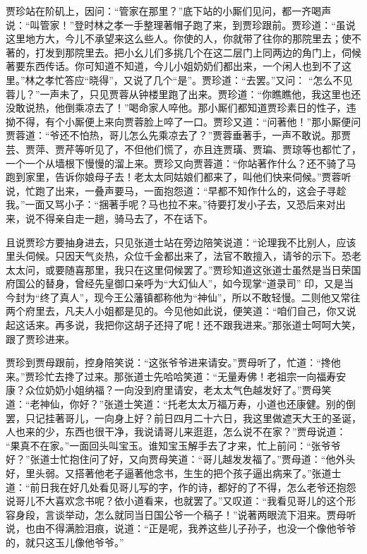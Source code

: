 \begin{parag}


    贾珍站在阶矶上，因问：“管家在那里？”底下站的小厮们见问，都一齐喝声说：“叫管家！”登时林之孝一手整理著帽子跑了来，到贾珍跟前。贾珍道：“虽说这里地方大，今儿不承望来这么些人。你使的人，你就带了往你的那院里去；使不著的，打发到那院里去。把小幺儿们多挑几个在这二层门上同两边的角门上，伺候著要东西传话。你可知道不知道，今儿小姐奶奶们都出来，一个闲人也到不了这里。”林之孝忙答应“晓得”，又说了几个“是”。贾珍道：“去罢。”又问： “怎么不见蓉儿？”一声未了，只见贾蓉从钟楼里跑了出来。贾珍道：“你瞧瞧他，我这里也还没敢说热，他倒乘凉去了！”喝命家人啐他。那小厮们都知道贾珍素日的性子，违拗不得，有个小厮便上来向贾蓉脸上啐了一口。贾珍又道：“问著他！”那小厮便问贾蓉道：“爷还不怕热，哥儿怎么先乘凉去了？”贾蓉垂著手，一声不敢说。那贾芸、贾萍、贾芹等听见了，不但他们慌了，亦且连贾璜、贾㻞、贾琼等也都忙了，一个一个从墙根下慢慢的溜上来。贾珍又向贾蓉道：“你站著作什么？还不骑了马跑到家里，告诉你娘母子去！老太太同姑娘们都来了，叫他们快来伺候。”贾蓉听说，忙跑了出来，一叠声要马，一面抱怨道：“早都不知作什么的，这会子寻趁我。”一面又骂小子：“捆著手呢？马也拉不来。”待要打发小子去，又恐后来对出来，说不得亲自走一趟，骑马去了，不在话下。
\end{parag}


\begin{parag}


    且说贾珍方要抽身进去，只见张道士站在旁边陪笑说道：“论理我不比别人，应该里头伺候。只因天气炎热，众位千金都出来了，法官不敢擅入，请爷的示下。恐老太太问，或要随喜那里，我只在这里伺候罢了。”贾珍知道这张道士虽然是当日荣国府国公的替身，曾经先皇御口亲呼为“大幻仙人”，如今现掌“道录司” 印，又是当今封为“终了真人”，现今王公藩镇都称他为“神仙”，所以不敢轻慢。二则他又常往两个府里去，凡夫人小姐都是见的。今见他如此说，便笑道：“咱们自己，你又说起这话来。再多说，我把你这胡子还挦了呢！还不跟我进来。”那张道士呵呵大笑，跟了贾珍进来。
\end{parag}


\begin{parag}


    贾珍到贾母跟前，控身陪笑说：“这张爷爷进来请安。”贾母听了，忙道：“搀他来。”贾珍忙去搀了过来。那张道士先哈哈笑道：“无量寿佛！老祖宗一向福寿安康？众位奶奶小姐纳福？一向没到府里请安，老太太气色越发好了。”贾母笑道：“老神仙，你好？”张道士笑道：“托老太太万福万寿，小道也还康健。别的倒罢，只记挂著哥儿，一向身上好？前日四月二十六日，我这里做遮天大王的圣诞，人也来的少，东西也很干净，我说请哥儿来逛逛，怎么说不在家？”贾母说道： “果真不在家。”一面回头叫宝玉。谁知宝玉解手去了才来，忙上前问：“张爷爷好？”张道士忙抱住问了好，又向贾母笑道：“哥儿越发发福了。”贾母道：“他外头好，里头弱。又搭著他老子逼著他念书，生生的把个孩子逼出病来了。”张道士道：“前日我在好几处看见哥儿写的字，作的诗，都好的了不得，怎么老爷还抱怨说哥儿不大喜欢念书呢？依小道看来，也就罢了。”又叹道：“我看见哥儿的这个形容身段，言谈举动，怎么就同当日国公爷一个稿子！”说著两眼流下泪来。贾母听说，也由不得满脸泪痕，说道：“正是呢，我养这些儿子孙子，也没一个像他爷爷的，就只这玉儿像他爷爷。”
\end{parag}


